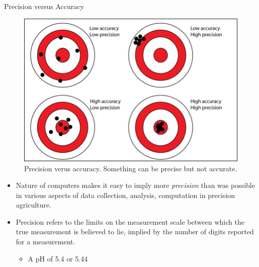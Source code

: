 \documentclass[11pt,dvipsnames,ignorenonframetext,aspectratio=169]{beamer}
\providecommand{\tightlist}{%
  \setlength{\itemsep}{0pt}\setlength{\parskip}{0pt}}
\begin{document}
\begin{frame}{Precision versus Accuracy}
\protect\hypertarget{precision-versus-accuracy}{}
\begin{figure}
\includegraphics[width=0.36\linewidth]{../images/precision_vs_accuracy_bulls_eye_view} \caption{Precision verus accuracy. Something can be precise but not accurate.}\label{fig:precision-vs-accuracy}
\end{figure}

\footnotesize

\begin{itemize}
\tightlist
\item
  Nature of computers makes it easy to imply more \emph{precision} than
  was possible in various aspects of data collection, analysis,
  computation in precision agriculture.
\item
  Precision refers to the limits on the measurement scale between which
  the true measurement is believed to lie, implied by the number of
  digits reported for a measurement.

  \begin{itemize}
  \tightlist
  \item
    A pH of 5.4 or 5.44
  \end{itemize}
\end{itemize}
\end{frame}
\end{document}
